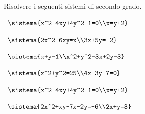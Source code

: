 \begin{esercizio}[*]
\label{ese:6.1}
Risolvere i seguenti sistemi di secondo grado.
\begin{enumeratea}
\item~\(\sistema{x^2-4xy+4y^2-1=0\\x=y+2}\)
\item~\(\sistema{2x^2-6xy=x\\3x+5y=-2}\)
\item~\(\sistema{x+y=1\\x^2+y^2-3x+2y=3}\)
\item~\(\sistema{x^2+y^2=25\\4x-3y+7=0}\)
\item~\(\sistema{x^2-4xy+4y^2-1=0\\x=y+2}\)
\item~\(\sistema{2x^2+xy-7x-2y=-6\\2x+y=3}\)
\end{enumeratea}
\end{esercizio}

